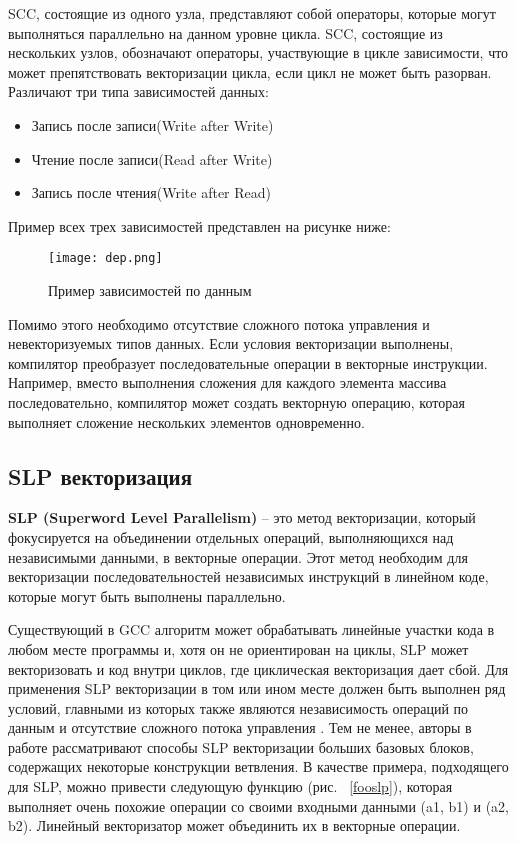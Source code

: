 SCC, состоящие из одного узла, представляют собой операторы, которые могут выполняться параллельно на данном уровне цикла. SCC, состоящие из нескольких узлов, обозначают операторы, участвующие в цикле зависимости, что может препятствовать векторизации цикла, если цикл не может быть разорван. Различают три типа зависимостей данных:

\begin{itemize}
    \item Запись после записи(Write after Write)
    \item Чтение после записи(Read after Write)
    \item Запись после чтения(Write after Read)
\end{itemize}

Пример всех трех зависимостей представлен на рисунке ниже:

\begin{figure}[!htb]
    \centering
    \texttt{[image: dep.png]}
    \caption{Пример зависимостей по данным}
\end{figure}

Помимо этого необходимо отсутствие сложного потока управления и невекторизуемых типов данных. Если условия векторизации выполнены, компилятор преобразует последовательные операции в векторные инструкции. Например, вместо выполнения сложения для каждого элемента массива последовательно, компилятор может создать векторную операцию, которая выполняет сложение нескольких элементов одновременно.

\subsection{SLP векторизация}
\textbf{SLP (Superword Level Parallelism)} – это метод векторизации, который фокусируется на объединении отдельных операций, выполняющихся над независимыми данными, в векторные операции. Этот метод необходим для векторизации последовательностей независимых инструкций в линейном коде, которые могут быть выполнены параллельно.

Существующий в GCC алгоритм может обрабатывать линейные участки кода в любом месте программы и, хотя он не ориентирован на циклы, SLP может векторизовать и код внутри циклов, где циклическая векторизация дает сбой. Для применения SLP векторизации в том или ином месте должен быть выполнен ряд условий, главными из которых также являются независимость операций по данным и отсутствие сложного потока управления \cite{chen2022all}. Тем не менее, авторы в работе \cite{shin2005superword} рассматривают способы SLP векторизации больших базовых блоков, содержащих некоторые конструкции ветвления. В качестве примера, подходящего для SLP, можно привести следующую функцию (рис. ~\ref{fooslp}), которая выполняет очень похожие операции со своими входными данными (a1, b1) и (a2, b2). Линейный векторизатор может объединить их в векторные операции.

